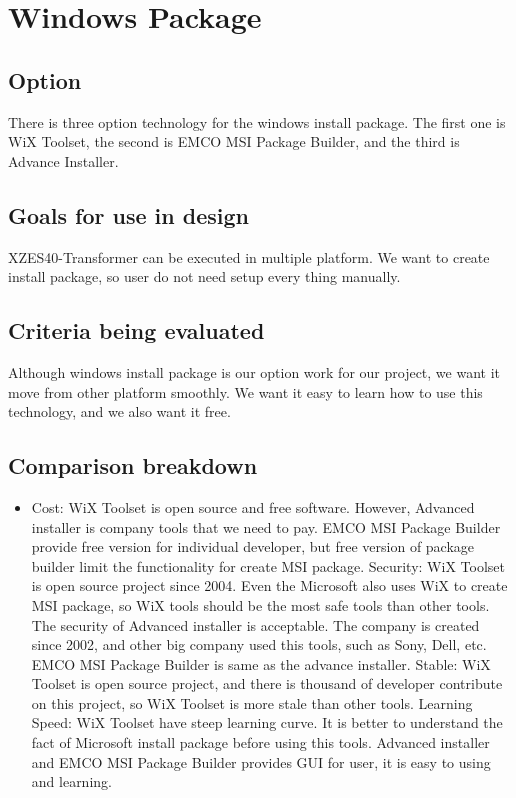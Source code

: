 \section{Windows Package}

\subsection{Option}
There is three option technology for the windows install package. The first one is WiX Toolset, the second is EMCO MSI Package Builder, and the third is Advance Installer.

\subsection{Goals for use in design}
XZES40-Transformer can be executed in multiple platform. We want to create install package, so user do not need setup every thing manually. 

\subsection{Criteria being evaluated}
Although windows install package is our option work for our project, we want it move from other platform smoothly. We want it easy to learn how to use this technology, and we also want it free. 

\subsection{Comparison breakdown}

	\begin{itemize}
		\item Cost: WiX Toolset is open source and free software. However, Advanced installer is company tools that we need to pay. EMCO MSI Package Builder provide free version for individual developer, but free version of package builder limit the functionality for create MSI package.
		\itme Security: WiX Toolset is open source project since 2004. Even the Microsoft also uses WiX to create MSI package, so WiX tools should be the most safe tools than other tools. The security of Advanced installer is acceptable. The company is created since 2002, and other big company used this tools, such as Sony, Dell, etc. EMCO MSI Package Builder is same as the advance installer.
		\itme Stable: WiX Toolset is open source project, and there is thousand of developer contribute on this project, so WiX Toolset is more stale than other tools.
		\itme Learning Speed: WiX Toolset have steep learning curve. It is better to understand the fact of Microsoft install package before using this tools. Advanced installer and EMCO MSI Package Builder provides GUI for user, it is easy to using and learning.
	\end{itemize}
	
